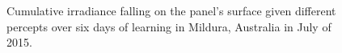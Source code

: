 \documentclass{article}
\begin{document}
{\begin{figure}[t]
\begin{center}
\caption{Cumulative irradiance falling on the panel's surface given different percepts over six days of learning in Mildura, Australia in July of 2015.}
\label{fig:results_aus}
\end{center}
\end{figure}

\begin{figure}
\begin{center}
	 \hspace{1mm} %
	 \hspace{1mm} %

\end{center}
\end{figure}}
\end{document}
